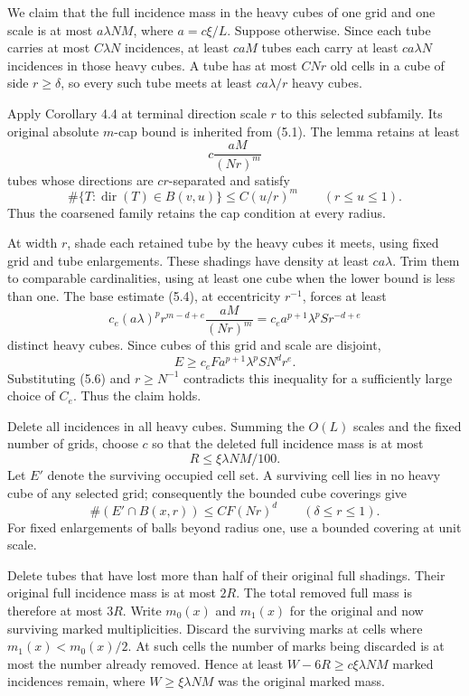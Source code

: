 \documentclass[
  11pt,
  a4paper,
]{article}
\begin{document}
We claim that the full incidence mass in the heavy cubes of one grid and
one scale is at most \(a\lambda NM\), where \(a=c\xi/L\). Suppose
otherwise. Since each tube carries at most \(C\lambda N\) incidences, at
least \(caM\) tubes each carry at least \(ca\lambda N\) incidences in
those heavy cubes. A tube has at most \(CNr\) old cells in a cube of
side \(r\ge\delta\), so every such tube meets at least \(ca\lambda/r\)
heavy cubes.

Apply Corollary 4.4 at terminal direction scale \(r\) to this selected
subfamily. Its original absolute \(m\)-cap bound is inherited from
(5.1). The lemma retains at least \[
 c\frac{aM}{(Nr)^m}
\] tubes whose directions are \(cr\)-separated and satisfy \[
 \#\{T:\operatorname{dir}(T)\in B(v,u)\}
 \le C(u/r)^m\qquad(r\le u\le1).                 \tag{5.7}\label{eq:5.7}
\] Thus the coarsened family retains the cap condition at every radius.

At width \(r\), shade each retained tube by the heavy cubes it meets,
using fixed grid and tube enlargements. These shadings have density at
least \(ca\lambda\). Trim them to comparable cardinalities, using at
least one cube when the lower bound is less than one. The base estimate
(5.4), at eccentricity \(r^{-1}\), forces at least \[
 c_e(a\lambda)^p r^{m-d+e}
      \frac{aM}{(Nr)^m}
 =c_e a^{p+1}\lambda^p S r^{-d+e}                \tag{5.8}\label{eq:5.8}
\] distinct heavy cubes. Since cubes of this grid and scale are
disjoint, \[
 E\ge c_e F a^{p+1}\lambda^pSN^dr^e.
\] Substituting (5.6) and \(r\ge N^{-1}\) contradicts this inequality
for a sufficiently large choice of \(C_e\). Thus the claim holds.

Delete all incidences in all heavy cubes. Summing the \(O(L)\) scales
and the fixed number of grids, choose \(c\) so that the deleted full
incidence mass is at most \[
 R\le\xi\lambda NM/100.
\] Let \(E'\) denote the surviving occupied cell set. A surviving cell
lies in no heavy cube of any selected grid; consequently the bounded
cube coverings give \[
 \#(E'\cap B(x,r))\le C F(Nr)^d
 \qquad(\delta\le r\le1).                        \tag{5.9}\label{eq:5.9}
\] For fixed enlargements of balls beyond radius one, use a bounded
covering at unit scale.

Delete tubes that have lost more than half of their original full
shadings. Their original full incidence mass is at most \(2R\). The
total removed full mass is therefore at most \(3R\). Write \(m_0(x)\)
and \(m_1(x)\) for the original and now surviving marked multiplicities.
Discard the surviving marks at cells where \(m_1(x)<m_0(x)/2\). At such
cells the number of marks being discarded is at most the number already
removed. Hence at least \(W-6R\ge c\xi\lambda NM\) marked incidences
remain, where \(W\ge\xi\lambda NM\) was the original marked mass.
\end{document}
